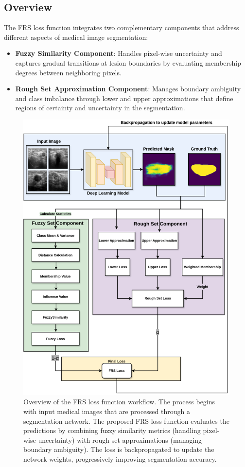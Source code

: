 \documentclass[review]{elsarticle}
\begin{document}
\subsection{Overview}
The FRS loss function integrates two complementary components that address different aspects of medical image segmentation:

\begin{itemize}
	\item \textbf{Fuzzy Similarity Component}: Handles pixel-wise uncertainty and captures gradual transitions at lesion boundaries by evaluating membership degrees between neighboring pixels.
	
	\item \textbf{Rough Set Approximation Component}: Manages boundary ambiguity and class imbalance through lower and upper approximations that define regions of certainty and uncertainty in the segmentation.
\end{itemize}


\begin{figure}[t]
    \centering
    \includegraphics[scale=0.4]{FRS Loss WorkFlow.png}
    \caption{Overview of the FRS loss function workflow. The process begins with input medical images that are processed through a segmentation network. The proposed FRS loss function evaluates the predictions by combining fuzzy similarity metrics (handling pixel-wise uncertainty) with rough set approximations (managing boundary ambiguity). The loss is backpropagated to update the network weights, progressively improving segmentation accuracy.}
    \label{Fig.workflow}
\end{figure}
\end{document}
